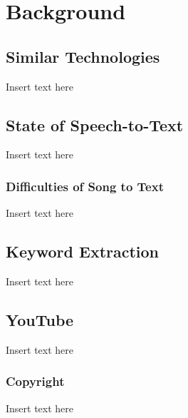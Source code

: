 \chapter{Background}

\section{Similar Technologies}

Insert text here

\section{State of Speech-to-Text}

Insert text here

\subsection{Difficulties of Song to Text}

Insert text here

\section{Keyword Extraction}

Insert text here

\section{YouTube}

Insert text here

\subsection{Copyright}

Insert text here

